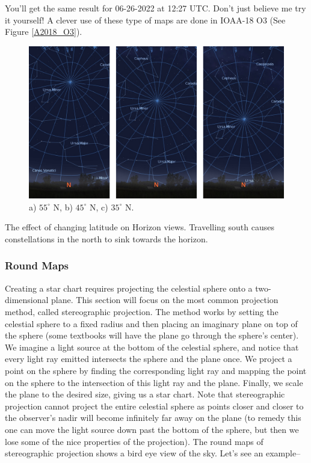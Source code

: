 \documentclass[a4paper,12pt]{extarticle}
\begin{document}
You'll get the same result for 06-26-2022 at 12:27 UTC. Don't just believe me try it yourself! A clever use of these type of maps are done in IOAA-18 O3 (See Figure \ref{A2018_O3}). 

\begin{figure}[H]
	\centering
	\includegraphics[width=0.9\linewidth]{skyhorizon.png}
	\caption{a) $55^\circ$ N, b) $45^\circ$ N, c) $35^\circ$ N.}
\end{figure}
The effect of changing latitude on Horizon views. Travelling south causes constellations in the north to sink towards the horizon.

\subsubsection{Round Maps}
Creating a star chart requires projecting the celestial sphere onto a two-dimensional plane. This section will focus on the most common projection method, called stereographic projection. The method works by setting the celestial sphere to a fixed radius and then placing
an imaginary plane on top of the sphere (some textbooks will have the plane go through the sphere's center). We imagine a light source at the bottom of the celestial sphere, and notice that every light ray emitted intersects the sphere and the plane once. We project a point
on the sphere by finding the corresponding light ray and mapping the point on the sphere to the intersection of this light ray and the plane. Finally, we scale the plane to the desired size, giving us a star chart. Note that stereographic projection cannot project the entire
celestial sphere as points closer and closer to the observer's nadir will become infinitely far away on the plane (to remedy this one can move the light source down past the bottom of the sphere, but then we lose some of the nice properties of the projection). The round maps of stereographic projection shows a bird eye view of the sky. Let's see an example--
\end{document}
